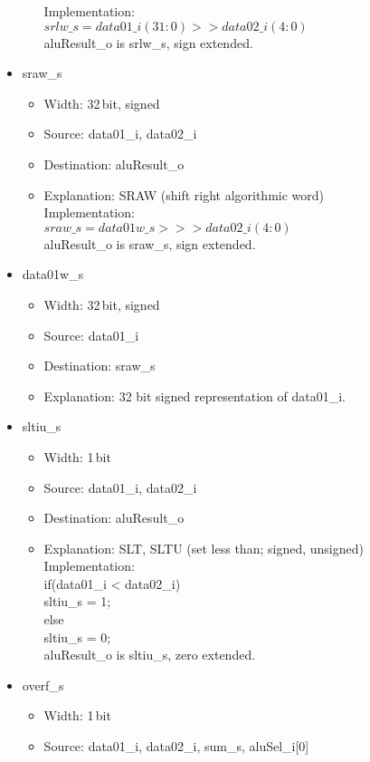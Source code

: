\begin{itemize}
\begin{itemize}
    Implementation: \\
    $srlw\_s = data01\_i(31:0) >> data02\_i(4:0)$ \\
    aluResult\_o is srlw\_s, sign extended.
  \end{itemize}
  \item sraw\_s
  \begin{itemize}
    \item Width: 32\,bit, signed
    \item Source: data01\_i, data02\_i
    \item Destination: aluResult\_o
    \item Explanation: SRAW (shift right algorithmic word) \\
    Implementation:\\
    $sraw\_s = data01w\_s >>> data02\_i(4:0)$\\
    aluResult\_o is sraw\_s, sign extended.
  \end{itemize}
  \item data01w\_s
  \begin{itemize}
    \item Width: 32\,bit, signed
    \item Source: data01\_i
    \item Destination: sraw\_s
    \item Explanation: 32 bit signed representation of data01\_i.
  \end{itemize}
  \item sltiu\_s
  \begin{itemize}
    \item Width: 1\,bit
    \item Source: data01\_i, data02\_i
    \item Destination: aluResult\_o
    \item Explanation: SLT, SLTU (set less than; signed, unsigned) \\
    Implementation:  \\
    if(data01\_i < data02\_i)  \\
    sltiu\_s = 1;  \\
    else  \\
    sltiu\_s = 0; \\
    aluResult\_o is sltiu\_s, zero extended.
  \end{itemize}
  \item overf\_s
  \begin{itemize}
    \item Width: 1\,bit
    \item Source: data01\_i, data02\_i, sum\_s, aluSel\_i[0]

\end{itemize}
\end{itemize}
